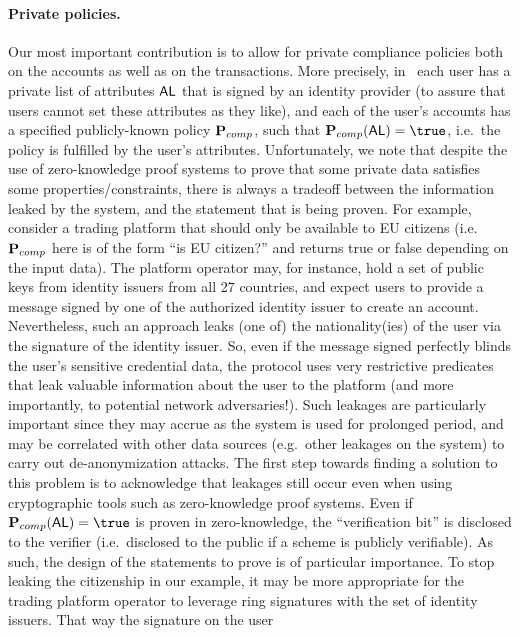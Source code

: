 \documentclass[runningheads,10pt]{llncs}
\numberwithin{equation}{section}
\begin{document}
\paragraph{Private policies.}
Our most important contribution is to allow for private compliance policies
both on the accounts as well as on the transactions. More precisely,
in~\cite{EPRINT:DGKOS20} each user has a private list of attributes $\mathsf{AL}$ that
is signed by an identity provider (to assure that users cannot set these
attributes as they like), and each of the user's accounts has a specified
publicly-known policy $\mathbf{P}_{comp}$, such that $\comppolicy(\AL) = \true$,
i.e.~the policy is fulfilled by the user's attributes. Unfortunately, we note
that despite the use of zero-knowledge proof systems to prove that some private
data satisfies some properties/constraints, there is always a tradeoff between
the information leaked by the system, and the statement that is being proven.
For example, consider a trading platform that should only be available to EU
citizens (i.e.~$\mathbf{P}_{comp}$ here is of the form ``is EU citizen?'' and returns
true or false depending on the input data). The platform operator may, for
instance, hold a set of public keys from identity issuers from all 27
countries, and expect users to provide a message signed by one of the
authorized identity issuer to create an account. Nevertheless, such an approach
leaks (one of) the nationality(ies) of the user via the signature of the
identity issuer. So, even if the message signed perfectly blinds the user's
sensitive credential data, the protocol uses very restrictive predicates that
leak valuable information about the user to the platform (and more importantly,
to potential network adversaries!). Such leakages are particularly important
since they may accrue as the system is used for prolonged period, and may be
correlated with other data sources (e.g.~other leakages on the system) to carry
out de-anonymization attacks. The first step towards finding a solution to this
problem is to acknowledge that leakages still occur even when using
cryptographic tools such as zero-knowledge proof systems. Even if
$\comppolicy(\AL) = \true$ is proven in zero-knowledge, the ``verification
bit'' is disclosed to the verifier (i.e.~disclosed to the public if a scheme is
publicly verifiable). As such, the design of the statements to prove is of
particular importance. To stop leaking the citizenship in our example, it may
be more appropriate for the trading platform operator to leverage ring
signatures with the set of identity issuers. That way the signature on the user
\end{document}
